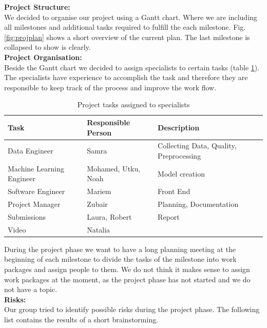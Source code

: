 \documentclass[a4paper,DIV=calc,11pt]{scrartcl}
\begin{document}
\textbf{Project Structure:}\\
We decided to organise our project using a Gantt chart. Where we are including all milestones and additional tasks required to fulfill the each milestone. Fig. \ref{fig:projplan} shows a short overview of the current plan. The last milestone is collapsed to show is clearly.\\

\textbf{Project Organisation:}\\
Beside the Gantt chart we decided to assign specialists to certain tasks (table \ref{tab:special}). The specialists have experience to accomplish the task and therefore they are responsible to keep track of the process and improve the work flow.\\


\begin{table}[ht]
\begin{tabular}{l|l|l}
Task                      & Responsible Person  & Description                             \\ \hline
Data Engineer             & Samra               & Collecting Data, Quality, Preprocessing \\
Machine Learning Engineer & Mohamed, Utku, Noah & Model creation                          \\
Software Engineer         & Mariem              & Front End                               \\
Project Manager           & Zubair              & Planning, Documentation                 \\
Submissions               & Laura, Robert       & Report                                  \\
Video                     & Natalia             &                                        
\end{tabular}
\caption{Project tasks assigned to specialists}
\label{tab:special}
\end{table}
During the project phase we want to have a long planning meeting at the beginning of each milestone to divide the tasks of the milestone into work packages and assign people to them. We do not think it makes sense to assign work packages at the moment, as the project phase has not started and we do not have a topic.\\

\textbf{Risks:}\\
Our group tried to identify possible risks during the project phase. The following list contains the results of a short brainstorming.
\end{document}
